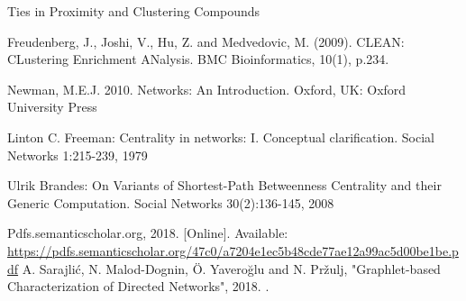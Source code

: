 \documentclass[9pt]{article}
\begin{document}
\begin{thebibliography}{8}
Ties in Proximity and Clustering Compounds

Freudenberg, J., Joshi, V., Hu, Z. and Medvedovic, M. (2009). CLEAN: CLustering Enrichment ANalysis. BMC Bioinformatics, 10(1), p.234.

Newman, M.E.J. 2010. Networks: An Introduction. Oxford, UK: Oxford University Press

Linton C. Freeman: Centrality in networks: I. Conceptual clarification. Social Networks 1:215-239, 1979

Ulrik Brandes: On Variants of Shortest-Path Betweenness Centrality and their Generic Computation. Social Networks 30(2):136-145, 2008

Pdfs.semanticscholar.org, 2018. [Online]. Available: \url{https://pdfs.semanticscholar.org/47c0/a7204e1ec5b48cde77ae12a99ac5d00be1be.pdf}
A. Sarajlić, N. Malod-Dognin, Ö. Yaveroğlu and N. Pržulj, "Graphlet-based Characterization of Directed Networks", 2018. .
\end{thebibliography}
\end{document}
